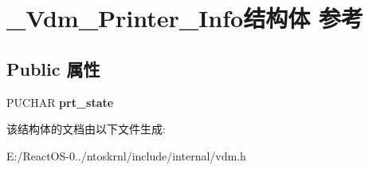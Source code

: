 \hypertarget{struct___vdm___printer___info}{}\section{\+\_\+\+Vdm\+\_\+\+Printer\+\_\+\+Info结构体 参考}
\label{struct___vdm___printer___info}
\subsection*{Public 属性}
\begin{DoxyCompactItemize}
\item 
\mbox{\label{struct___vdm___printer___info_ae026664fb8763140fdc68f1d90769c3f}} 
P\+U\+C\+H\+AR {\bfseries prt\+\_\+state}
\end{DoxyCompactItemize}


该结构体的文档由以下文件生成\+:\begin{DoxyCompactItemize}
\item 
E\+:/\+React\+O\+S-\/0../ntoskrnl/include/internal/vdm.\+h\end{DoxyCompactItemize}
